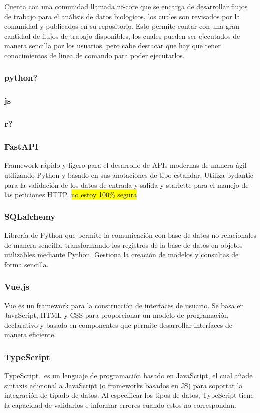 Cuenta con una comunidad llamada nf-core que se encarga de desarrollar flujos de trabajo para el análisis de datos biologicos, los cuales son revisados por la comunidad y publicados en su repositorio. Esto permite contar con una gran cantidad de flujos de trabajo disponibles, los cuales pueden ser ejecutados de manera sencilla por los usuarios, pero cabe destacar que hay que tener conocimientos de linea de comando para poder ejecutarlos.


\subsubsection{python?}
\subsubsection{js}

\subsubsection{r?}

\subsubsection{FastAPI}
Framework rápido  y ligero para el desarrollo de APIs modernas de manera ágil utilizando Python y basado en sus anotaciones de tipo estandar.
Utiliza pydantic para la validación de los datos de entrada y salida y starlette para el manejo de las peticiones HTTP. \hl{no estoy 100\% segura}
\subsubsection{SQLalchemy}
Librería de Python que permite la comunicación con base de datos no relacionales de manera sencilla, transformando los registros de la base de datos en objetos utilizables mediante Python. Gestiona la creación de modelos y consultas de forma sencilla.
\subsubsection{Vue.js}
Vue es un framework para la construcción de interfaces de usuario. Se basa en JavaScript, HTML y CSS para proporcionar un modelo de programación declarativo y basado en componentes que permite desarrollar interfaces de manera eficiente.
\subsubsection{TypeScript}  
TypeScript~\cite{bierman2014understanding} es un lenguaje de programación basado en JavaScript, el cual añade sintaxis adicional a JavaScript (o frameworks basados en JS) para soportar la integración de tipado de datos. Al especificar los tipos de datos, TypeScript tiene la capacidad de validarlos e informar errores cuando estos no correspondan.
